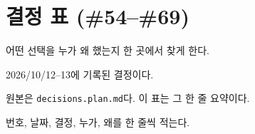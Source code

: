 \section{결정 표 (\#54--\#69)}\label{sec:08-decision-table}

\begin{inbrief}
  \item[Why] 어떤 선택을 누가 왜 했는지 한 곳에서 찾게 한다.
  \item[When] 2026/10/12--13에 기록된 결정이다.
  \item[Where] 원본은 \texttt{decisions.plan.md}다. 이 표는 그 한 줄 요약이다.
  \item[How] 번호, 날짜, 결정, 누가, 왜를 한 줄씩 적는다.
\end{inbrief}

